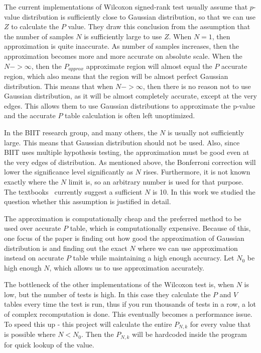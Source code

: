 \documentclass[12pt]{article}
\begin{document}
{The current implementations of Wilcoxon signed-rank test usually assume that $p$-value distribution is sufficiently close to Gaussian distribution, so that we can use $Z$ to calculate the $P$ value. They draw this conclusion from the assumption that the number of samples $N$ is sufficiently large to use $Z$. When $N = 1$, then approximation is quite inaccurate. As number of samples increases, then the approximation becomes more and more accurate on absolute scale. When the $N->\infty$, then the $P_{approx}$ approximate region will almost equal the $P$ accurate region, which also means that the region will be almost perfect Gaussian distribution. This means that when $N->\infty$, then there is no reason not to use Gaussian distribution, as it will be almost completely accurate, except at the very edges. This allows them to use Gaussian distributions to approximate the p-value and the accurate $P$ table calculation is often left unoptimized.

In the BIIT research group, and many others, the $N$ is usually not sufficiently large. This means that Gaussian distribution should not be used. Also, since BIIT uses multiple hypothesis testing, the approximation must be good even at the very edges of distribution. As mentioned above, the Bonferroni correction will lower the significance level significantly as $N$ rises. Furthermore, it is not known exactly where the $N$ limit is, so an arbitrary number is used for that purpose. The textbooks~\cite{lowry_concepts} currently suggest a sufficient $N$ is 10. In this work we studied the question whether this assumption is justified in detail.

The approximation is computationally cheap and the preferred method to be used over accurate $P$ table, which is computationally expensive. Because of this, one focus of the paper is finding out how good the approximation of Gaussian distribution is and finding out the exact $N$ where we can use approximation instead on accurate $P$ table while maintaining a high enough accuracy. Let $N_0$ be high enough $N$, which allows us to use approximation accurately.

The bottleneck of the other implementations of the Wilcoxon test is, when $N$ is low, but the number of tests is high. In this case they calculate the $P$ and $V$ tables every time the test is run, thus if you run thousands of tests in a row, a lot of complex recomputation is done. This eventually becomes a performance issue. To speed this up - this project will calculate the entire $P_{N, k}$ for every value that is possible where $N < N_0$. Then the $P_{N, k}$ will be hardcoded inside the program for quick lookup of the value.


}
\end{document}
